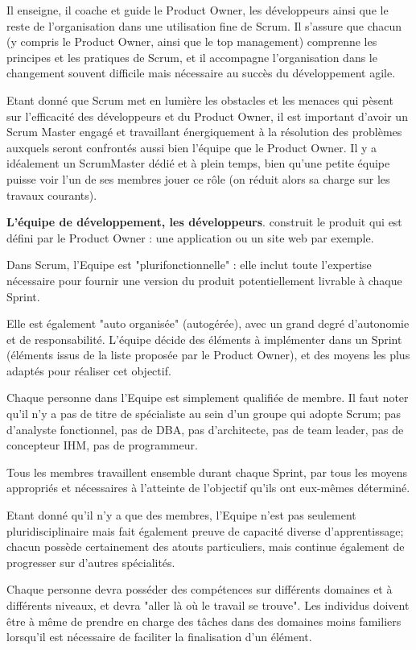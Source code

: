 \begin{description}
Il enseigne, il coache et guide le Product Owner, les développeurs ainsi que le reste de l’organisation dans une utilisation fine de Scrum. Il s’assure que chacun (y compris le Product Owner, ainsi que le top management) comprenne les principes et les pratiques de Scrum, et il accompagne l’organisation dans le changement souvent difficile mais nécessaire au succès du développement agile. 

Etant donné que Scrum met en lumière les obstacles et les menaces qui pèsent sur l’efficacité des développeurs et du Product Owner, 
il est important d’avoir un Scrum Master engagé et travaillant énergiquement à la résolution des problèmes auxquels seront confrontés aussi bien l’équipe que le Product Owner. 
Il y a idéalement un ScrumMaster dédié et à plein temps, bien qu’une petite équipe puisse voir l’un de ses membres jouer ce rôle (on réduit alors sa charge sur les travaux courants).  
    \item \textbf{L'équipe de développement, les développeurs}. construit le produit qui est défini par le Product Owner : une application ou un site web par exemple. 

Dans Scrum, l’Equipe est "plurifonctionnelle" : elle inclut toute l’expertise nécessaire pour fournir une version du produit potentiellement livrable à chaque Sprint. 

Elle est également "auto organisée" (autogérée), avec un grand degré d’autonomie et de responsabilité. L’équipe décide des éléments à implémenter dans un Sprint (éléments issus de la liste proposée par le Product Owner), et des moyens les plus adaptés pour réaliser cet objectif.

Chaque personne dans l’Equipe est simplement qualifiée de membre. Il faut noter qu’il n’y a pas de
titre de spécialiste au sein d’un groupe qui adopte Scrum; pas d’analyste fonctionnel, pas de DBA,
pas d’architecte, pas de team leader, pas de concepteur IHM, pas de programmeur. 


Tous les membres travaillent ensemble durant chaque Sprint, par tous les moyens appropriés et 
nécessaires à l’atteinte de l’objectif qu’ils ont eux-mêmes déterminé.

Etant donné qu’il n’y a que des membres, l’Equipe n’est pas seulement pluridisciplinaire mais fait
également preuve de capacité diverse d’apprentissage; chacun possède certainement des atouts
particuliers, mais continue également de progresser sur d’autres spécialités. 

Chaque personne devra posséder des compétences sur différents domaines et à différents niveaux, et devra "aller là où le travail se trouve". Les individus doivent être à même de prendre en charge des tâches dans des
domaines moins familiers lorsqu’il est nécessaire de faciliter la finalisation d’un élément. 


\end{description}
